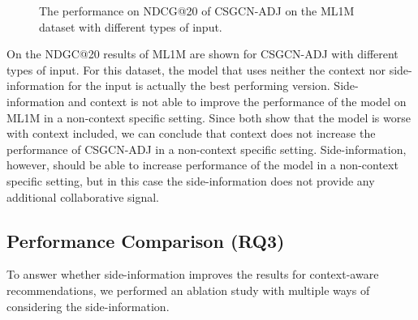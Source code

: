 \begin{figure}
    \caption{The performance on NDCG@20 of CSGCN-ADJ on the ML1M dataset with different types of input.}
    \label{fig:ablation_study_2}
\end{figure}
On  the NDGC@20 results of ML1M are shown for CSGCN-ADJ with different types of input. 
For this dataset, the model that uses neither the context nor side-information for the input is actually the best performing version.
Side-information and context is not able to improve the performance of the model on ML1M in a non-context specific setting.
Since both  show that the model is worse with context included, we can conclude that context does not increase the performance of CSGCN-ADJ in a non-context specific setting.
Side-information, however, should be able to increase performance of the model in a non-context specific setting, but in this case the side-information does not provide any additional collaborative signal.

\subsection{Performance Comparison (RQ3)}
To answer whether side-information improves the results for context-aware recommendations, we performed an ablation study with multiple ways of considering the side-information.
